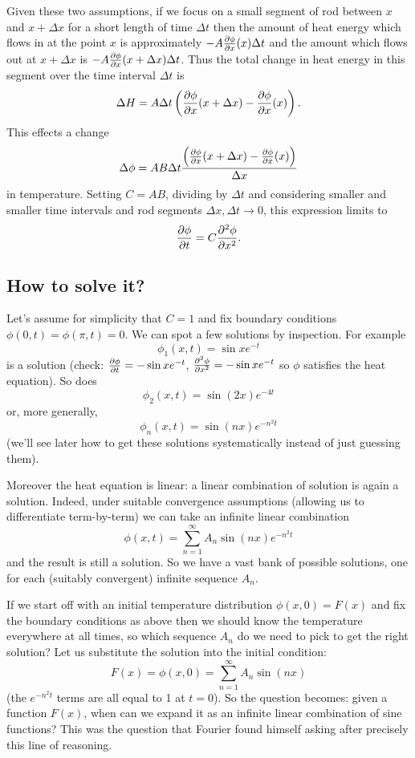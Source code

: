 Given these two assumptions, if we focus on a small segment of rod between $x$ and $x+\Delta x$ for a short length of time $\Delta t$ then the amount of heat energy which flows in at the point $x$ is approximately $-A\frac{\partial \phi}{\partial x}(x)\Delta t$ and the amount which flows out at $x+\Delta x$ is $-A\frac{\partial \phi}{\partial x}(x+\Delta x)\Delta t$. Thus the total change in heat energy in this segment over the time interval $\Delta t$ is
\[\Delta H=A\Delta t\left(\frac{\partial \phi}{\partial x}(x+\Delta x)-\frac{\partial \phi}{\partial x}(x)\right).\]
This effects a change
\[\Delta\phi=AB\Delta t\frac{\left(\frac{\partial \phi}{\partial x}(x+\Delta x)-\frac{\partial \phi}{\partial x}(x)\right)}{\Delta x}\]
in temperature. Setting $C=AB$, dividing by $\Delta t$ and considering smaller and smaller time intervals and rod segments $\Delta x,\Delta t\to 0$, this expression limits to
\[\frac{\partial \phi}{\partial t}=C\frac{\partial^2 \phi}{\partial x ^2}.\]

\subsection{How to solve it?}

Let's assume for simplicity that $C=1$ and fix boundary conditions $\phi(0,t)=\phi(\pi,t)=0$. We can spot a few solutions by inspection. For example
\[\phi_1(x,t)=\sin x e^{-t}\]
is a solution (check: $\frac{\partial \phi}{\partial t}=-\sin x e^{-t}$, $\frac{\partial^2 \phi}{\partial x ^2}=-\sin x e^{-t}$ so $\phi$ satisfies the heat equation). So does
\[\phi_2(x,t)=\sin(2x)e^{-4t}\]
or, more generally,
\[\phi_n(x,t)=\sin(nx)e^{-n^2t}\]
(we'll see later how to get these solutions systematically instead of just guessing them).

Moreover the heat equation is linear: a linear combination of solution is again a solution. Indeed, under suitable convergence assumptions (allowing us to differentiate term-by-term) we can take an infinite linear combination
\[\phi(x,t)=\sum_{n=1}^{\infty}A_n\sin(nx)e^{-n^2t}\]
and the result is still a solution. So we have a vast bank of possible solutions, one for each (suitably convergent) infinite sequence $A_n$.

If we start off with an initial temperature distribution $\phi(x,0)=F(x)$ and fix the boundary conditions as above then we should know the temperature everywhere at all times, so which sequence $A_n$ do we need to pick to get the right solution? Let us substitute the solution into the initial condition:
\[F(x)=\phi(x,0)=\sum_{n=1}^{\infty}A_n\sin(nx)\]
(the $e^{-n^2t}$ terms are all equal to 1 at $t=0$). So the question becomes: given a function $F(x)$, when can we expand it as an infinite linear combination of sine functions? This was the question that Fourier found himself asking after precisely this line of reasoning.

